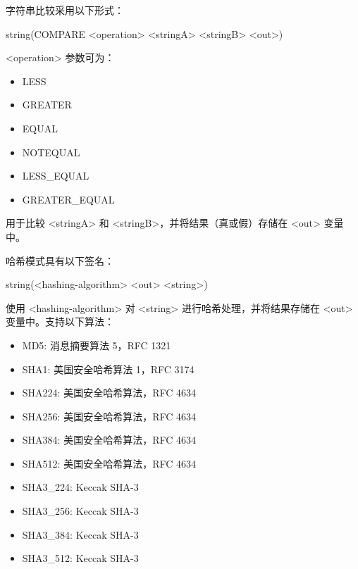 
字符串比较采用以下形式：

\begin{cmake}
string(COMPARE <operation> <stringA> <stringB> <out>)
\end{cmake}

<operation> 参数可为：

\begin{itemize}
\item
LESS

\item
GREATER

\item
EQUAL

\item
NOTEQUAL

\item
LESS\_EQUAL

\item
GREATER\_EQUAL
\end{itemize}

用于比较 <stringA> 和 <stringB>，并将结果（真或假）存储在 <out> 变量中。


哈希模式具有以下签名：

\begin{cmake}
string(<hashing-algorithm> <out> <string>)
\end{cmake}

使用 <hashing-algorithm> 对 <string> 进行哈希处理，并将结果存储在 <out> 变量中。支持以下算法：

\begin{itemize}
\item
MD5: 消息摘要算法 5，RFC 1321

\item
SHA1: 美国安全哈希算法 1，RFC 3174

\item
SHA224: 美国安全哈希算法，RFC 4634

\item
SHA256: 美国安全哈希算法，RFC 4634

\item
SHA384: 美国安全哈希算法，RFC 4634

\item
SHA512: 美国安全哈希算法，RFC 4634

\item
SHA3\_224: Keccak SHA-3

\item
SHA3\_256: Keccak SHA-3

\item
SHA3\_384: Keccak SHA-3

\item
SHA3\_512: Keccak SHA-3
\end{itemize}

